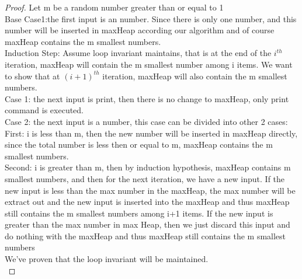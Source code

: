 \documentclass[11pt]{article}
\begin{document}
\begin{proof}
Let m be a random number greater than or equal to 1\\
Base Case1:the first input is an number. Since there is only one number, and this number will be inserted in maxHeap according our algorithm and of course maxHeap contains the m smallest numbers.\\
Induction Step: Assume loop invariant maintains, that is at the end of the $i^{th}$ iteration, maxHeap will contain the m smallest number among i items. We want to show that at $(i+1)^{th}$ iteration, maxHeap will also contain the m smallest numbers.\\
Case 1: the next input is print, then there is no change to maxHeap, only print command is executed.\\
Case 2: the next input is a number, this case can be divided into other 2 cases:\\
First: i is less than m, then the new number will be inserted in maxHeap directly, since the total number is less then or equal to m, maxHeap contains the m smallest numbers.\\
Second: i is greater than m, then by induction hypothesis, maxHeap contains m smallest numbers, and then for the next iteration, we have a new input. If the new input is less than the max number in the maxHeap, the max number will be extract out and the new input is inserted into the maxHeap and thus maxHeap still contains the m smallest numbers among i+1 items. If the new input is greater than the max number in max Heap, then we just discard this input and do nothing with the maxHeap and thus maxHeap still contains the m smallest numbers\\
We've proven that the loop invariant will be maintained.\\
\end{proof}
\end{document}
